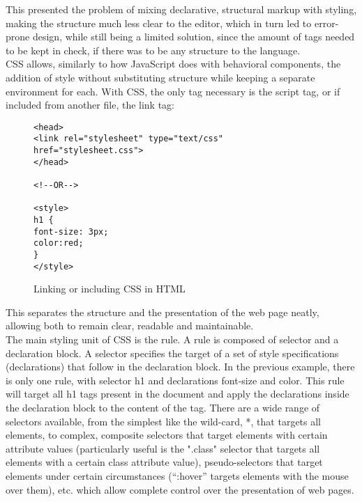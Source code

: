 This presented the problem of mixing declarative, structural markup with styling, making the structure much less clear to
the editor, which in turn led to error-prone design, while still being a limited solution, since the amount of tags needed
to be kept in check, if there was to be any structure to the language.\\

CSS allows, similarly to how JavaScript does with behavioral components, the addition of style without substituting
structure while keeping a separate environment for each. With CSS, the only tag necessary is the script tag, or if included
from another file, the link tag:
\begin{figure}[h]
\centering
{}
\begin{verbatim}
<head>
<link rel="stylesheet" type="text/css" href="stylesheet.css">
</head>

<!--OR-->

<style>
h1 {
font-size: 3px;
color:red;
}
</style>
\end{verbatim}
\caption{Linking or including CSS in HTML}
\end{figure}
This separates the structure and the presentation of the web page neatly, allowing both to remain clear, readable and
maintainable.\\

The main styling unit of CSS is the rule. A rule is composed of selector and a declaration block. A selector specifies the
target of a set of style specifications (declarations) that follow in the declaration block. In the previous example, there
is only one rule, with selector h1 and declarations font-size and color. This rule will target all h1 tags present in the
document and apply the declarations inside the declaration block to the content of the tag. There are a wide range of
selectors available, from the simplest like the wild-card, *, that targets all elements, to complex, composite selectors
that target elements with certain attribute values (particularly useful is the ".class" selector that targets all elements
with a certain class attribute value), pseudo-selectors that target elements under certain circumstances (``:hover''
targets elements with the mouse over them), etc. which allow complete control over the presentation of web pages.\\

